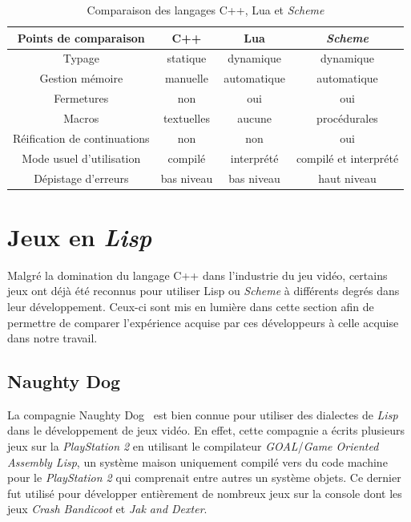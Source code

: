 \documentclass[12pt,twoside,letterpaper,francais]{book}
\newcommand{\lisp}{{\textit{Lisp }}}
\newcommand{\Schemelang}{{\textit{Scheme }}}
\begin{document}
\begin{table}
\begin{tabular}{cccc}
Points de comparaison         & C++ & Lua & \Schemelang\\
\hline \hline
Typage                       & statique & dynamique & dynamique\\
Gestion mémoire              & manuelle & automatique & automatique\\
Fermetures                   & non & oui & oui\\
Macros                       & textuelles & aucune & procédurales\\
Réification de continuations & non & non & oui\\
Mode usuel d'utilisation     & compilé & interprété & compilé et interprété\\
Dépistage d'erreurs          & bas niveau & bas niveau & haut niveau\\
\hline
\end{tabular}
\caption{Comparaison des langages C++, Lua et \Schemelang}
\label{Rev:lang-comp}
\end{table}


\FloatBarrier
\section{Jeux en \lisp}
Malgré la domination du langage C++ dans l'industrie du jeu vidéo,
certains jeux ont déjà été reconnus pour utiliser Lisp ou \Schemelang à
différents degrés dans leur développement. Ceux-ci sont mis en lumière
dans cette section afin de permettre de comparer l'expérience acquise
par ces développeurs à celle acquise dans notre travail.


\FloatBarrier
\subsection{Naughty Dog}
La compagnie Naughty Dog~\cite{ND} est bien connue pour utiliser des
dialectes de \lisp dans le développement de jeux vidéo. En effet,
cette compagnie a écrits plusieurs jeux sur la \textit{PlayStation 2}
en utilisant le compilateur \textit{GOAL}/\textit{Game Oriented
  Assembly Lisp}, un système maison uniquement compilé vers du code
machine pour le \textit{PlayStation 2} qui comprenait entre autres un
système objets. Ce dernier fut utilisé pour développer entièrement de
nombreux jeux sur la console dont les jeux \textit{Crash Bandicoot} et
\textit{Jak and Dexter}.
\end{document}

